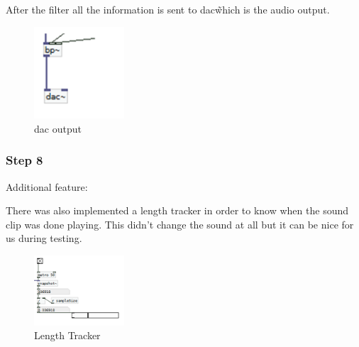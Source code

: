 After the filter all the information is sent to dac\~ which is the audio output.

\begin{figure}[!htbp]
    \centering
    \includegraphics[width=0.3\textwidth]{images/Implementation9.png}
    \caption{dac output}
    \label{fig:implementation9}
\end{figure}



\subsubsection*{Step 8} %
\label{ssub:step_8}

Additional feature:

There was also implemented a length tracker in order to know when the sound clip was done playing. 
This didn’t change the sound at all but it can be nice for us during testing.

\begin{figure}[!htbp]
    \centering
    \includegraphics[width=0.3\textwidth]{images/Implementation10.png}
    \caption{Length Tracker}
    \label{fig:implementation10}
\end{figure}



